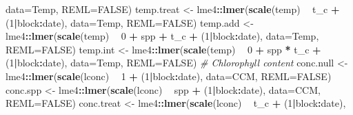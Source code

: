 \documentclass[]{scrartcl}
\newenvironment{Shaded}{\begin{snugshade}}{\end{snugshade}}
\newcommand{\CommentTok}[1]{\textcolor[rgb]{0.56,0.35,0.01}{\textit{#1}}}
\newcommand{\DataTypeTok}[1]{\textcolor[rgb]{0.13,0.29,0.53}{#1}}
\newcommand{\DecValTok}[1]{\textcolor[rgb]{0.00,0.00,0.81}{#1}}
\newcommand{\KeywordTok}[1]{\textcolor[rgb]{0.13,0.29,0.53}{\textbf{#1}}}
\newcommand{\NormalTok}[1]{#1}
\newcommand{\OperatorTok}[1]{\textcolor[rgb]{0.81,0.36,0.00}{\textbf{#1}}}
\newcommand{\OtherTok}[1]{\textcolor[rgb]{0.56,0.35,0.01}{#1}}
\newcommand{\StringTok}[1]{\textcolor[rgb]{0.31,0.60,0.02}{#1}}
\begin{document}
\begin{Shaded}
\begin{Highlighting}[]
{{{{{{{{{{{{                              \DataTypeTok{data=}\NormalTok{Temp, }\DataTypeTok{REML=}\OtherTok{FALSE}\NormalTok{)}
\NormalTok{    temp.treat <-}\StringTok{ }\NormalTok{lme4}\OperatorTok{::}\KeywordTok{lmer}\NormalTok{(}\KeywordTok{scale}\NormalTok{(temp) }\OperatorTok{~}\StringTok{ }\NormalTok{t_c }\OperatorTok{+}\StringTok{ }\NormalTok{(}\DecValTok{1}\OperatorTok{|}\NormalTok{block}\OperatorTok{:}\NormalTok{date), }
                                \DataTypeTok{data=}\NormalTok{Temp, }\DataTypeTok{REML=}\OtherTok{FALSE}\NormalTok{)}
\NormalTok{    temp.add <-}\StringTok{ }\NormalTok{lme4}\OperatorTok{::}\KeywordTok{lmer}\NormalTok{(}\KeywordTok{scale}\NormalTok{(temp) }\OperatorTok{~}\StringTok{ }\DecValTok{0} \OperatorTok{+}\StringTok{ }\NormalTok{spp }\OperatorTok{+}\StringTok{ }\NormalTok{t_c }\OperatorTok{+}\StringTok{ }\NormalTok{(}\DecValTok{1}\OperatorTok{|}\NormalTok{block}\OperatorTok{:}\NormalTok{date), }
                              \DataTypeTok{data=}\NormalTok{Temp, }\DataTypeTok{REML=}\OtherTok{FALSE}\NormalTok{)}
\NormalTok{    temp.int <-}\StringTok{ }\NormalTok{lme4}\OperatorTok{::}\KeywordTok{lmer}\NormalTok{(}\KeywordTok{scale}\NormalTok{(temp) }\OperatorTok{~}\StringTok{ }\DecValTok{0} \OperatorTok{+}\StringTok{ }\NormalTok{spp }\OperatorTok{*}\StringTok{ }\NormalTok{t_c  }\OperatorTok{+}\StringTok{ }\NormalTok{(}\DecValTok{1}\OperatorTok{|}\NormalTok{block}\OperatorTok{:}\NormalTok{date), }
                              \DataTypeTok{data=}\NormalTok{Temp, }\DataTypeTok{REML=}\OtherTok{FALSE}\NormalTok{)}
  \CommentTok{# Chlorophyll content}
\NormalTok{    conc.null <-}\StringTok{ }\NormalTok{lme4}\OperatorTok{::}\KeywordTok{lmer}\NormalTok{(}\KeywordTok{scale}\NormalTok{(lconc) }\OperatorTok{~}\StringTok{ }\DecValTok{1} \OperatorTok{+}\StringTok{ }\NormalTok{(}\DecValTok{1}\OperatorTok{|}\NormalTok{block}\OperatorTok{:}\NormalTok{date), }
                            \DataTypeTok{data=}\NormalTok{CCM, }\DataTypeTok{REML=}\OtherTok{FALSE}\NormalTok{)}
\NormalTok{    conc.spp <-}\StringTok{ }\NormalTok{lme4}\OperatorTok{::}\KeywordTok{lmer}\NormalTok{(}\KeywordTok{scale}\NormalTok{(lconc) }\OperatorTok{~}\StringTok{ }\NormalTok{spp }\OperatorTok{+}\StringTok{ }\NormalTok{(}\DecValTok{1}\OperatorTok{|}\NormalTok{block}\OperatorTok{:}\NormalTok{date), }
                           \DataTypeTok{data=}\NormalTok{CCM, }\DataTypeTok{REML=}\OtherTok{FALSE}\NormalTok{)}
\NormalTok{    conc.treat <-}\StringTok{ }\NormalTok{lme4}\OperatorTok{::}\KeywordTok{lmer}\NormalTok{(}\KeywordTok{scale}\NormalTok{(lconc) }\OperatorTok{~}\StringTok{ }\NormalTok{t_c }\OperatorTok{+}\StringTok{ }\NormalTok{(}\DecValTok{1}\OperatorTok{|}\NormalTok{block}\OperatorTok{:}\NormalTok{date), }
}}}}}}}}}}}}
\end{Highlighting}
\end{Shaded}
\end{document}
